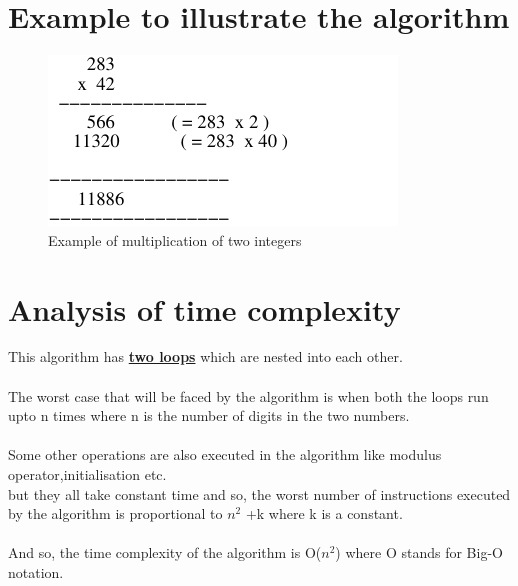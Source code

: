 \documentclass[10pt,a4paper]{article}
\begin{document}
\newpage
\section{Example to illustrate the algorithm}

\begin{figure}
\centering
\caption{Example of multiplication of two integers}
\label{ex:example}

  \includegraphics[scale=2]{example}
\end{figure}

\newpage
\section{Analysis of time complexity}
\large This algorithm has \textbf{\underline{two loops}} which are nested into each other.
\\
\\
The worst case that will be faced by the algorithm is when both the loops run upto n times where n is the number of digits in the
two numbers.
\\
\\
Some other operations are also executed in the algorithm like modulus operator,initialisation etc.
\\
 but they all take constant time and so, the worst number of instructions executed by the algorithm
is proportional to $n^2$ +k where k is a constant.
\\
\\
And so, the time complexity of the algorithm is O($n^2$) where O stands for Big-O notation.
\end{document}
